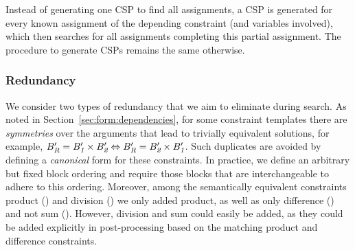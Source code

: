 Instead of generating one CSP to find all assignments, a CSP is generated for every known assignment of the depending constraint (and variables involved), which then searches for all assignments completing this partial assignment.
The procedure to generate CSPs remains the same otherwise.





%





\subsubsection{Redundancy}
We consider two types of redundancy that we aim to eliminate during search.
As noted in Section~\ref{sec:form:dependencies}, for some constraint templates there are \textit{symmetries} over the arguments that lead to trivially equivalent solutions, for example, $B_{\textit{R}}' = B_{\textit{1}}' \times B_{\textit{2}}' \Leftrightarrow B_{\textit{R}}' = B_{\textit{2}}' \times B_{\textit{1}}'$.
Such duplicates are avoided by defining a \textit{canonical} form for these constraints.
In practice, we define an arbitrary but fixed block ordering and require those blocks that are interchangeable to adhere to this ordering.
Moreover, among the semantically equivalent constraints product () and division () we only added product, as well as only difference () and not sum (). However, division and sum could easily be added, as they could be added explicitly in post-processing based on the matching product and difference constraints.


